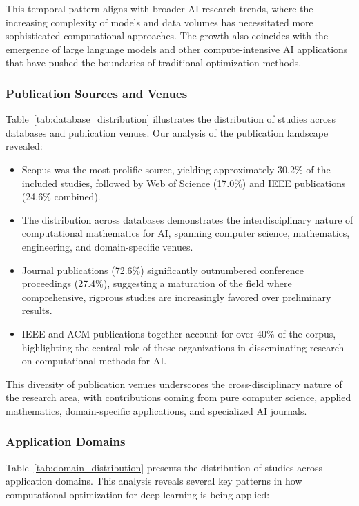 This temporal pattern aligns with broader AI research trends, where the increasing complexity of models and data volumes has necessitated more sophisticated computational approaches. The growth also coincides with the emergence of large language models and other compute-intensive AI applications that have pushed the boundaries of traditional optimization methods.

\subsubsection{Publication Sources and Venues}
Table~\ref{tab:database_distribution} illustrates the distribution of studies across databases and publication venues. Our analysis of the publication landscape revealed:

\begin{itemize}
    \item Scopus was the most prolific source, yielding approximately 30.2\% of the included studies, followed by Web of Science (17.0\%) and IEEE publications (24.6\% combined).
    \item The distribution across databases demonstrates the interdisciplinary nature of computational mathematics for AI, spanning computer science, mathematics, engineering, and domain-specific venues.
    \item Journal publications (72.6\%) significantly outnumbered conference proceedings (27.4\%), suggesting a maturation of the field where comprehensive, rigorous studies are increasingly favored over preliminary results.
    \item IEEE and ACM publications together account for over 40\% of the corpus, highlighting the central role of these organizations in disseminating research on computational methods for AI.
\end{itemize}

This diversity of publication venues underscores the cross-disciplinary nature of the research area, with contributions coming from pure computer science, applied mathematics, domain-specific applications, and specialized AI journals.

\subsubsection{Application Domains}
Table~\ref{tab:domain_distribution} presents the distribution of studies across application domains. This analysis reveals several key patterns in how computational optimization for deep learning is being applied:

